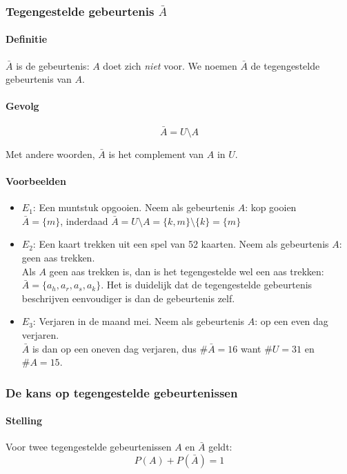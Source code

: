 \documentclass[12pt,twoside]{article}
\begin{document}
\subsubsection{Tegengestelde gebeurtenis $\bar{A}$}

\paragraph*{Definitie} $\bar{A}$ is de gebeurtenis: $A$ doet zich {\em niet} voor. We noemen $\bar{A}$ de tegengestelde gebeurtenis van $A$.

\paragraph*{Gevolg}
  \begin{mdframed}
  $$\bar{A}=U\setminus A$$
  \end{mdframed}

Met andere woorden, $\bar{A}$ is het complement van $A$ in $U$.

\paragraph*{Voorbeelden} 
\begin{itemize}
  \item $E_1$: Een muntstuk opgooien. Neem als gebeurtenis $A$: kop gooien\\
  $\bar{A}=\{m\}$, inderdaad $\bar{A}=U\setminus A=\{k,m\}\setminus\{k\}=\{m\}$
  \item $E_2$: Een kaart trekken uit een spel van 52 kaarten. Neem als gebeurtenis $A$: geen aas trekken.\\
  Als $A$ geen aas trekken is, dan is het tegengestelde wel een aas trekken: $\bar{A}=\{a_h, a_r, a_s, a_k\}$. Het is duidelijk dat de tegengestelde gebeurtenis beschrijven eenvoudiger is dan de gebeurtenis zelf.
  \item $E_3$: Verjaren in de maand mei. Neem als gebeurtenis $A$: op een even dag verjaren.\\
  $\bar{A}$ is dan op een oneven dag verjaren, dus $\#\bar{A}=16$ want $\#U=31$ en $\#A=15$.
\end{itemize}

\subsubsection{De kans op tegengestelde gebeurtenissen}

\paragraph*{Stelling} Voor twee tegengestelde gebeurtenissen $A$ en $\bar{A}$ geldt:
$$P(A) + P(\bar{A})=1$$
\end{document}
